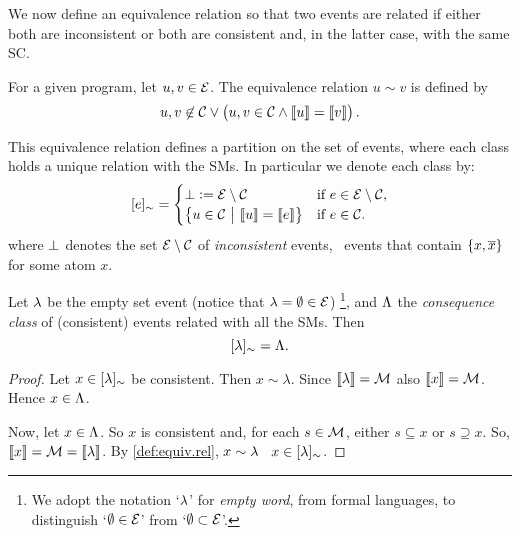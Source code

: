 \documentclass[x11names]{tlp}
\begin{document}
We now define an equivalence relation so that two events are related if either both are inconsistent or both are consistent and, in the latter case, with the same \acl{SC}.
\begin{definition}\label{def:equiv.rel}

	For a given program, let $u, v \in {\mathcal{E}}$.
	The equivalence relation
	$u \sim v$ is defined by
	\begin{equation}
		u,v \not\in\CONSISTset \vee \del{u,v \in \CONSISTset \wedge \stablecore{u} = \stablecore{v}}.\label{eq:equiv.rel}
	\end{equation}

\end{definition}

This equivalence relation defines a partition on the set of events, where each class holds a unique relation with the \aclp{SM}.
In particular we denote each class by:
\begin{equation}
	\class{e} =
	\begin{cases}
		\inconsistent := \EVENTSset \setminus \CONSISTset
		 & \text{if~} e \in \EVENTSset \setminus \CONSISTset, %
		\\
		\set{u \in \CONSISTset \given \stablecore{u} = \stablecore{e}}
		 & \text{if~} e \in \CONSISTset.
	\end{cases}\label{eq:event.class}
\end{equation}
where $\bot$ denotes the set ${\mathcal{E}}\setminus{\mathcal{C}}$ of \emph{inconsistent} events, \ie\ events that contain $\set{x,\ensuremath{\overline{x}}}$ for some atom $x$.

\begin{proposition}
	\label{prop:consequence.class}
	Let $\lambda$ be the empty set event (notice that $\lambda = \emptyset \in {\mathcal{E}}$)
	\footnote{We adopt the notation `$\lambda$' for \emph{empty word}, from formal languages, to distinguish `$\emptyset \in {\mathcal{E}}$' from `$\emptyset \subset{\mathcal{E}}$'.}, and $\Lambda$ the \emph{consequence class} of (consistent) events related with all the
	\aclp{SM}.
	Then
	\begin{equation}
		[{\lambda}]_{\sim} = \Lambda.
	\end{equation}
\end{proposition}
\begin{proof}
	Let $x \in [{\lambda}]_{\sim}$ be consistent.
	Then $x \sim \lambda$. Since $\left\llbracket \lambda \right\rrbracket = {\mathcal{M}}$ also $\left\llbracket x \right\rrbracket = {\mathcal{M}}$. Hence  $x\in\Lambda$.

	Now, let $x \in \Lambda$. So $x$ is consistent and, for each $s \in {\mathcal{M}}$, either $s \subseteq x$ or $s \supseteq x$. So, $\left\llbracket x \right\rrbracket = {\mathcal{M}} = \left\llbracket \lambda \right\rrbracket$. By \cref{def:equiv.rel}, $x \sim \lambda$ \ie\ $x \in [{\lambda}]_{\sim}$.
	\hfill
\end{proof}
\end{document}
